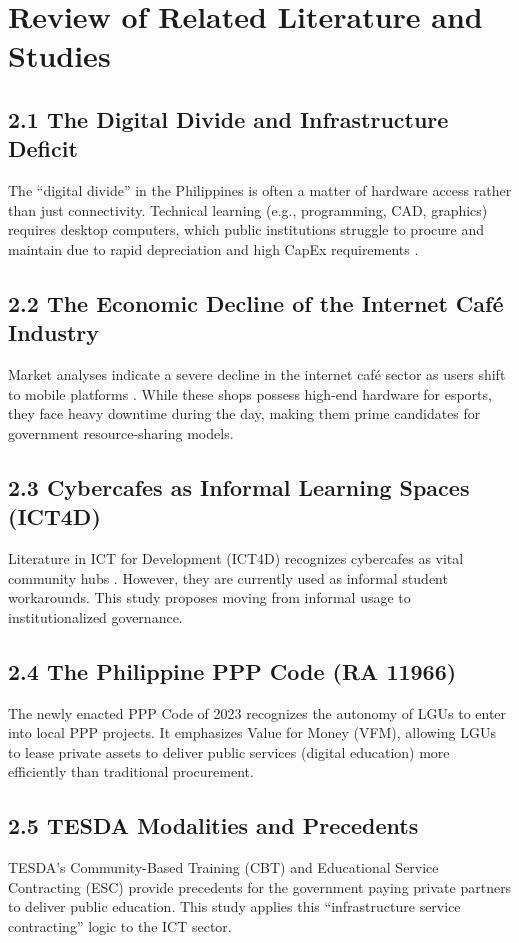 \section{Review of Related Literature and Studies}

\subsection*{2.1 The Digital Divide and Infrastructure Deficit}
The ``digital divide'' in the Philippines is often a matter of hardware access rather than just connectivity. Technical learning (e.g., programming, CAD, graphics) requires desktop computers, which public institutions struggle to procure and maintain due to rapid depreciation and high CapEx requirements \citep{ulas2018}.

\subsection*{2.2 The Economic Decline of the Internet Café Industry}
Market analyses indicate a severe decline in the internet café sector as users shift to mobile platforms \citep{garcia2019}. While these shops possess high-end hardware for esports, they face heavy downtime during the day, making them prime candidates for government resource-sharing models.

\subsection*{2.3 Cybercafes as Informal Learning Spaces (ICT4D)}
Literature in ICT for Development (ICT4D) recognizes cybercafes as vital community hubs \citep{robinson2009}. However, they are currently used as informal student workarounds. This study proposes moving from informal usage to institutionalized governance.

\subsection*{2.4 The Philippine PPP Code (RA 11966)}
The newly enacted PPP Code of 2023 \citep{pppcode2023} recognizes the autonomy of LGUs to enter into local PPP projects. It emphasizes Value for Money (VFM), allowing LGUs to lease private assets to deliver public services (digital education) more efficiently than traditional procurement.

\subsection*{2.5 TESDA Modalities and Precedents}
TESDA’s Community-Based Training (CBT) and Educational Service Contracting (ESC) provide precedents for the government paying private partners to deliver public education. This study applies this ``infrastructure service contracting'' logic to the ICT sector.